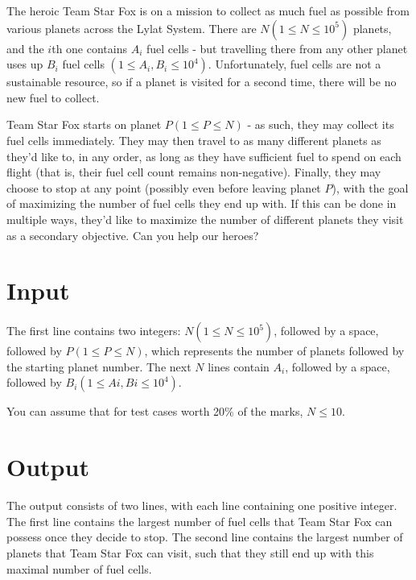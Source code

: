 
The heroic Team Star Fox is on a mission to collect as much fuel as possible from various planets across the Lylat System. There are $N (1 \leq N \leq 10^5)$ planets, and the $i$th one contains $A_i$ fuel cells - but travelling there from any other planet uses up $B_i$ fuel cells $(1 \leq A_i,B_i \leq 10^4)$. Unfortunately, fuel cells are not a sustainable resource, so if a planet is visited for a second time, there will be no new fuel to collect.

Team Star Fox starts on planet $P (1 \leq P \leq N)$ - as such, they may collect its fuel cells immediately. They may then travel to as many different planets as they'd like to, in any order, as long as they have sufficient fuel to spend on each flight (that is, their fuel cell count remains non-negative). Finally, they may choose to stop at any point (possibly even before leaving planet $P$), with the goal of maximizing the number of fuel cells they end up with. If this can be done in multiple ways, they'd like to maximize the number of different planets they visit as a secondary objective. Can you help our heroes? 

\section*{Input}
The first line contains two integers: $N (1 \leq N \leq 10^5)$, followed by a space, followed by $P (1 \leq P \leq N)$, which represents the number of planets followed by the starting planet number. The next $N$ lines contain $A_i$, followed by a space, followed by $B_i (1 \leq Ai,Bi \leq 10^4)$.

You can assume that for test cases worth 20\% of the marks, $N \leq 10$.

\section*{Output}

The output consists of two lines, with each line containing one positive integer. The first line contains the largest number of fuel cells that Team Star Fox can possess once they decide to stop. The second line contains the largest number of planets that Team Star Fox can visit, such that they still end up with this maximal number of fuel cells.
